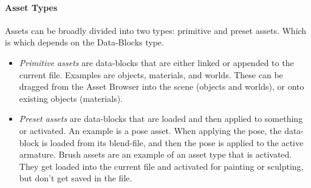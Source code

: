 \documentclass{article}
\begin{document}
\paragraph{Asset Types}
Assets can be broadly divided into two types: primitive and preset assets. Which is which depends on the Data-Blocks type.
\begin{itemize}[noitemsep, topsep=0pt]
    \item \textit{Primitive assets} are data-blocks that are either linked or appended to the current file. Examples are objects, materials, and worlds. These can be dragged from the Asset Browser into the scene (objects and worlds), or onto existing objects (materials).
    \item \textit{Preset assets} are data-blocks that are loaded and then applied to something or activated. An example is a pose asset. When applying the pose, the data-block is loaded from its blend-file, and then the pose is applied to the active armature. Brush assets are an example of an asset type that is activated. They get loaded into the current file and activated for painting or sculpting, but don’t get saved in the file.
\end{itemize}
\end{document}
